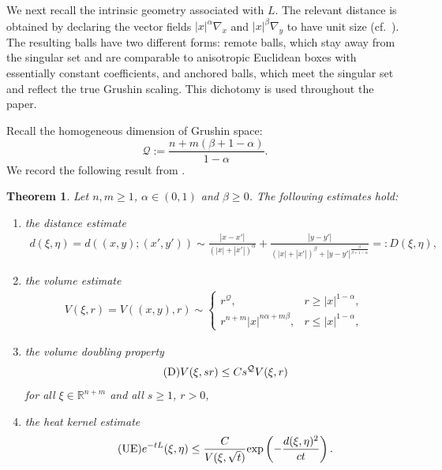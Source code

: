 \documentclass[12pt]{amsart}
\newtheorem{theorem}{Theorem}[section]
\begin{document}
We next recall the intrinsic geometry associated with $L$. The relevant distance is obtained by declaring the vector fields $|x|^{\alpha} \nabla_x$ and $|x|^\beta \nabla_y$ to have unit size (cf.~\cite{JS}). The resulting balls have two different forms: remote balls, which stay away from the singular set and are comparable to anisotropic Euclidean boxes with essentially constant coefficients, and anchored balls, which meet the singular set and reflect the true Grushin scaling. This dichotomy is used throughout the paper.

Recall the homogeneous dimension of Grushin space:
\begin{equation*}
    \mathcal Q:= \frac{n+m(\beta+1-\alpha)}{1-\alpha}.
\end{equation*}
We record the following result from \cite[Proposition~5.1, Theorem~6.4, Corollary~6.6]{RS}.

\begin{theorem}\cite{RS}\label{RS_Grushin}
Let $n,m\ge 1$, $\alpha \in (0,1)$ and $\beta \ge 0$. The following estimates hold:
\begin{enumerate}[label=(\roman*)]
\item the distance estimate
\begin{align*}
d(\xi,\eta) = d((x,y);(x',y')) \sim \frac{|x-x'|}{\left( |x| + |x'| \right)^\alpha} + \frac{|y-y'|}{(|x|+|x'|)^{\beta} + |y-y'|^{\frac{\beta}{\beta+1-\alpha}}} =: D(\xi,\eta),
\end{align*}
\item the volume estimate
\begin{align*}
V(\xi,r) = V((x,y),r) \sim \begin{cases}
r^{\mathcal{Q}}, & r\ge |x|^{1-\alpha},\\
r^{n+m}|x|^{n \alpha + m\beta}, & r\le |x|^{1-\alpha},
\end{cases}
\end{align*}
\item the volume doubling property
\begin{align}\label{D}\tag{$\mathrm{D}$}
V(\xi,sr) \le C s^{\mathcal{Q}} V(\xi,r)
\end{align}
for all $\xi \in \mathbb{R}^{n+m}$ and all $s\ge 1$, $r>0$,
\item the heat kernel estimate
\begin{equation}\label{UE}\tag{$\mathrm{UE}$}
e^{-tL}(\xi,\eta) \le \frac{C}{V(\xi, \sqrt{t})} \textrm{exp} \left( - \frac{d(\xi,\eta)^2}{ct} \right).
\end{equation}
\end{enumerate}
\end{theorem}
\end{document}
